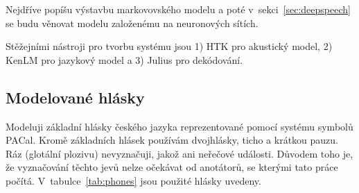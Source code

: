 Nejdříve popíšu výstavbu markovovského modelu a poté
v~sekci~\ref{sec:deepspeech} se budu věnovat modelu založenému na neuronových
sítích.



Stěžejními nástroji pro tvorbu systému jsou 1) HTK pro akustický model, 2) KenLM
pro jazykový model a 3) Julius pro dekódování.

\subsection{Modelované hlásky}
\label{ssec:ac:fonetika}

Modeluji základní hlásky českého jazyka\cite{palkova1992fonetika}
reprezentované pomocí systému symbolů PACal\cite{nouza1997phonetic}. Kromě základních hlásek
používám dvojhlásky, ticho a krátkou pauzu. Ráz (glotální plozivu) nevyznačuji,
jakož ani neřečové události. Důvodem toho je, že vyznačování těchto jevů nelze
očekávat od anotátorů, se kterými tato práce počítá.
V~tabulce~\ref{tab:phones} jsou použité hlásky uvedeny.

